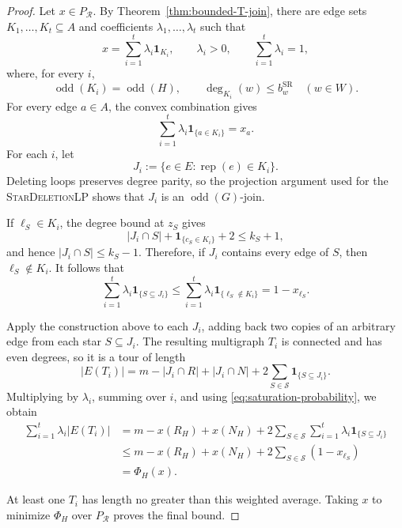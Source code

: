 \documentclass[11pt]{amsart}
\DeclareMathOperator{\odd}{odd}
\newcommand{\rep}[1]{\operatorname{rep}(#1)}
\newcommand{\1}{\mathbbm{1}}
\newcommand{\LPone}{\textsc{StarDeletionLP}}
\begin{document}
\begin{proof}

Let $x\in {P_{\mathcal R}}$. By Theorem~\ref{thm:bounded-T-join}, there are
edge sets $K_1,\ldots,K_t\subseteq A$ and coefficients
$\lambda_1,\ldots,\lambda_t$ such that
\begin{equation}
\label{eq:framework-2-join-decomposition}
    x=\sum_{i=1}^{t}\lambda_i\mathbf{1}_{K_i},
    \qquad \lambda_i>0,
    \qquad \sum_{i=1}^{t}\lambda_i=1,
\end{equation}
where, for every $i$,
\[
    \odd(K_i)=\odd(H),
    \qquad \deg_{K_i}(w)\le b^{\mathrm{SR}}_w\quad(w\in W).
\]
For every edge $a\in A$, the convex combination gives
\[
    \sum_{i=1}^{t}\lambda_i\mathbf{1}_{\{a\in K_i\}}=x_a.
\]
For each $i$, let
\[
    J_i:=\{e\in E:\rep{e}\in K_i\}.
\]
Deleting loops preserves degree parity, so the projection
argument used for the \LPone{} shows that $J_i$
is an $\odd(G)$-join.

If $\ell_S\in K_i$, the degree bound at $z_S$ gives
\[
    |J_i\cap S|+\mathbf{1}_{\{c_S\in K_i\}}+2\le k_S+1,
\]
and hence $|J_i\cap S|\le k_S-1$. Therefore, if $J_i$
contains every edge of $S$, then $\ell_S\notin K_i$. It follows that
\begin{equation}
\label{eq:saturation-probability}
    \sum_{i=1}^{t}\lambda_i\mathbf{1}_{\{S\subseteq J_i\}}
    \le \sum_{i=1}^{t}\lambda_i\mathbf{1}_{\{\ell_S\notin K_i\}}
    =1-x_{\ell_S}.
\end{equation}

Apply the construction above to each $J_i$, adding back two
copies of an arbitrary edge from each star $S\subseteq J_i$.
The resulting multigraph $T_i$ is connected and has even
degrees, so it is a tour of length
\[
    |E(T_i)|=m-|J_i\cap R|+|J_i\cap N|
       +2\sum_{S\in\mathcal S}\mathbf{1}_{\{S\subseteq J_i\}}.
\]
Multiplying by $\lambda_i$, summing over $i$, and using
\eqref{eq:saturation-probability}, we obtain
\[
\begin{aligned}
    \sum_{i=1}^{t}\lambda_i|E(T_i)|
    &=m-x(R_H)+x(N_H)
      +2\sum_{S\in\mathcal S}\sum_{i=1}^{t}
            \lambda_i\mathbf{1}_{\{S\subseteq J_i\}}\\
    &\le m-x(R_H)+x(N_H)
      +2\sum_{S\in\mathcal S}(1-x_{\ell_S})\\
    &=\Phi_H(x).
\end{aligned}
\]


At least one $T_i$ has length no greater than this weighted average.
Taking $x$ to minimize $\Phi_H$ over ${P_{\mathcal R}}$ proves the final bound.
\end{proof}
\end{document}
